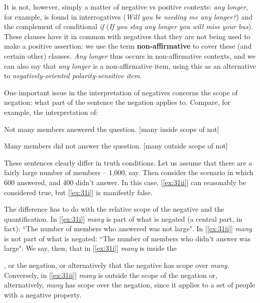 It is not, however, simply a matter of negative vs positive contexts: \textit{any longer}, for example, is found in interrogatives (\textit{Will you be needing me any longer?}) and the complement of conditional \textit{if} (\textit{If you stay any longer you will miss your bus}). These clauses have it in common with negatives that they are not being used to make a positive assertion: we use the term \textbf{non-affirmative} to cover these (and certain other) clauses. \textit{Any longer} thus occurs in non-affirmative contexts, and we can also say that \textit{any longer} is a {non-affirmative item}, using this as an alternative to \textit{negatively-oriented polarity-sensitive item}.

One important issue in the interpretation of negatives concerns the {scope of negation}: what part of the sentence the negation applies to. Compare, for example, the interpretation of:
\begin{examples}
\item \label{ex:31}
    \begin{examples}
        \item \label{ex:31i} Not many members answered the question. \hfill \textnormal{[many inside scope of not]}
        \item \label{ex:31ii} Many members did not answer the question. \hfill \textnormal{[many outside scope of not]}
    \end{examples}
\end{examples}

These sentences clearly differ in truth conditions. Let us assume that there are a fairly large number of members -- 1,000, say. Then consider the scenario in which 600 answered, and 400 didn't answer. In this case, [\ref{ex:31ii}] can reasonably be considered true, but [\ref{ex:31i}] is manifestly false.

The difference has to do with the relative scope of the negative and the quantification. In [\ref{ex:31i}] \textit{many} is part of what is negated (a central part, in fact): ``The number of members who answered was not large". In [\ref{ex:31ii}] \textit{many} is not part of what is negated: ``The number of members who didn't answer was large". We say, then, that in [\ref{ex:31i}] \textit{many} is {inside the}



, or the negation, or alternatively that the negative has scope over \textit{many}. Conversely, in [\ref{ex:31ii}] \textit{many} is {outside the scope of the negation} or, alternatively, \textit{many} has scope over the negation, since it applies to a set of people with a negative property.

